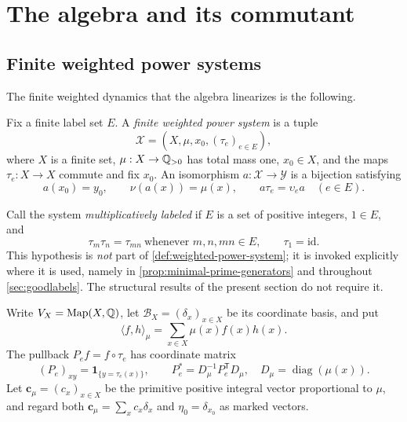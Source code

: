 \section{The algebra and its commutant}
\label{sec:algebra}

\subsection{Finite weighted power systems}
\label{sec:systems}

The finite weighted dynamics that the algebra linearizes is the following.

\begin{definition}
\label{def:weighted-power-system}
Fix a finite label set \(E\).  A \emph{finite weighted power system} is a
tuple
\[
 \mathscr X=(X,\mu,x_0,(\tau_e)_{e\in E}),
\]
where \(X\) is a finite set, \(\mu:X\to\mathbb Q_{>0}\) has total mass one,
\(x_0\in X\), and the maps \(\tau_e:X\to X\) commute and fix \(x_0\).
An isomorphism \(a:\mathscr X\to\mathscr Y\) is a bijection satisfying
\[
 a(x_0)=y_0,\qquad \nu(a(x))=\mu(x),\qquad
 a\tau_e=\upsilon_ea\quad(e\in E).
\]
\end{definition}

\begin{definition}
\label{def:multiplicative-labels}
Call the system \emph{multiplicatively labeled} if \(E\) is a set of positive
integers, \(1\in E\), and
\begin{equation}
 \tau_m\tau_n=\tau_{mn}\ \text{whenever }m,n,mn\in E,
 \qquad
 \tau_1=\mathrm{id}.
 \label{eq:label-multiplicativity}
\end{equation}
This hypothesis is \emph{not} part of \cref{def:weighted-power-system}; it is
invoked explicitly where it is used, namely in
\cref{prop:minimal-prime-generators} and throughout
\cref{sec:goodlabels}.  The structural results of the present section do
not require it.
\end{definition}

Write \(V_X=\operatorname{Map}(X,\mathbb Q)\), let
\(\mathcal B_X=(\delta_x)_{x\in X}\) be its coordinate basis, and put
\[
 \langle f,h\rangle_\mu=\sum_{x\in X}\mu(x)f(x)h(x).
\]
The pullback \(P_e f=f\circ\tau_e\) has coordinate matrix
\begin{equation}
 (P_e)_{xy}=\mathbf1_{\{y=\tau_e(x)\}},
 \qquad
 P_e^*=D_\mu^{-1}P_e^{\mathsf T}D_\mu,
 \quad D_\mu=\operatorname{diag}(\mu(x)).
 \label{eq:system-adjoint}
\end{equation}
Let \(\mathbf c_\mu=(c_x)_{x\in X}\) be the primitive positive integral
vector proportional to \(\mu\), and regard both
\(\mathbf c_\mu=\sum_xc_x\delta_x\) and
\(\eta_0=\delta_{x_0}\) as marked vectors.

